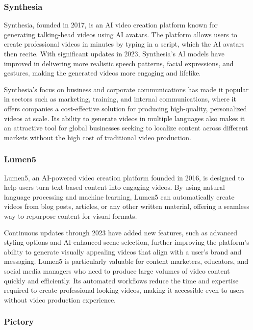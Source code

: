 \subsubsection{Synthesia}

Synthesia, founded in 2017, is an AI video creation platform known for generating talking-head videos using AI avatars. 
The platform allows users to create professional videos in minutes by typing in a script, which the AI avatars then recite. 
With significant updates in 2023, Synthesia's AI models have improved in delivering more realistic speech patterns, facial expressions, and gestures, making the generated videos more engaging and lifelike.

Synthesia's focus on business and corporate communications has made it popular in sectors such as marketing, training, and internal communications, where it offers companies a cost-effective solution for producing high-quality, personalized videos at scale. 
Its ability to generate videos in multiple languages also makes it an attractive tool for global businesses seeking to localize content across different markets without the high cost of traditional video production.

\subsubsection{Lumen5}

Lumen5, an AI-powered video creation platform founded in 2016, is designed to help users turn text-based content into engaging videos. 
By using natural language processing and machine learning, Lumen5 can automatically create videos from blog posts, articles, or any other written material, offering a seamless way to repurpose content for visual formats.

Continuous updates through 2023 have added new features, such as advanced styling options and AI-enhanced scene selection, further improving the platform's ability to generate visually appealing videos that align with a user's brand and messaging. 
Lumen5 is particularly valuable for content marketers, educators, and social media managers who need to produce large volumes of video content quickly and efficiently. 
Its automated workflows reduce the time and expertise required to create professional-looking videos, making it accessible even to users without video production experience.

\subsubsection{Pictory}


